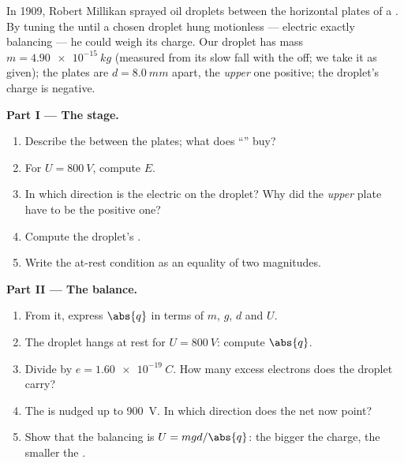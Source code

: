\begin{problem}
\label{pb:g11:electric-gravitational-fields:1}
In 1909, Robert Millikan sprayed oil droplets between the horizontal
plates of a . By tuning the  until a chosen droplet
hung motionless --- electric  exactly balancing  --- he
could weigh its charge. Our droplet has mass $m = \qty{4.90e-15}{kg}$
(measured from its slow fall with the  off; we take it as given);
the plates are $d = \qty{8.0}{mm}$ apart, the \emph{upper} one
positive; the droplet's charge is negative.

\medskip
\noindent\textbf{Part I --- The stage.}
\begin{enumerate}
  \item Describe the  between the plates; what does ``'' buy?
  \item For $U = \qty{800}{V}$, compute $E$.
  \item In which direction is the electric  on the droplet? Why
        did the \emph{upper} plate have to be the positive one?
  \item Compute the droplet's .
  \item Write the at-rest condition as an equality of two 
        magnitudes.
\end{enumerate}

\medskip
\noindent\textbf{Part II --- The balance.}
\begin{enumerate}[resume]
  \item From it, express $\abs{q}$ in terms of $m$, $g$, $d$ and $U$.
  \item The droplet hangs at rest for $U = \qty{800}{V}$: compute
        $\abs{q}$.
  \item Divide by $e = \qty{1.60e-19}{C}$. How many excess electrons
        does the droplet carry?
  \item The  is nudged up to \qty{900}{V}. In which direction
        does the net  now point?
  \item Show that the balancing  is $U = mgd/\abs{q}$: the
        bigger the charge, the smaller the .
\end{enumerate}


\end{problem}
